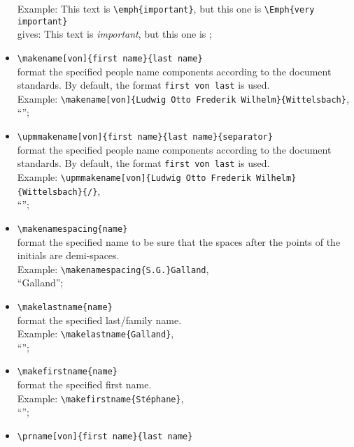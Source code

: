 \documentclass[book,taskpackage,specpackage,codepackage]{upmethodology-document}
\begin{document}
\begin{itemize}
	Example: This text is \texttt{{\textbackslash}emph\{important\}}, but this one is \texttt{{\textbackslash}Emph\{very important\}} \\
	gives: This text is \emph{important}, but this one is ;
\item \texttt{{\textbackslash}makename[von]\{first name\}\{last name\}} \\
	format the specified people name components according to the document standards. By default, the format \texttt{first von last} is used. \\
	Example: \texttt{{\textbackslash}makename[von]\{Ludwig Otto Frederik Wilhelm\}\{Wittelsbach\}},\\
		``'';
\item \texttt{{\textbackslash}upmmakename[von]\{first name\}\{last name\}\{separator\}} \\
	format the specified people name components according to the document standards. By default, the format \texttt{first von last} is used. \\
	Example: \texttt{{\textbackslash}upmmakename[von]\{Ludwig Otto Frederik Wilhelm\}\{Wittelsbach\}\{/\}}, \\
		``'';
\item \texttt{{\textbackslash}makenamespacing\{name\}} \\
	format the specified name to be sure that the spaces after the points of the initials are demi-spaces. \\
	Example: \texttt{{\textbackslash}makenamespacing\{S\string.G\string.\}Galland}, \\
		``Galland'';
\item \texttt{{\textbackslash}makelastname\{name\}} \\
	format the specified last/family name. \\
	Example: \texttt{{\textbackslash}makelastname\{Galland\}}, \\
		``'';
\item \texttt{{\textbackslash}makefirstname\{name\}} \\
	format the specified first name. \\
	Example: \texttt{{\textbackslash}makefirstname\{St\'ephane\}}, \\
		``'';
\item \texttt{{\textbackslash}prname[von]\{first name\}\{last name\}} \\

\end{itemize}
\end{document}
